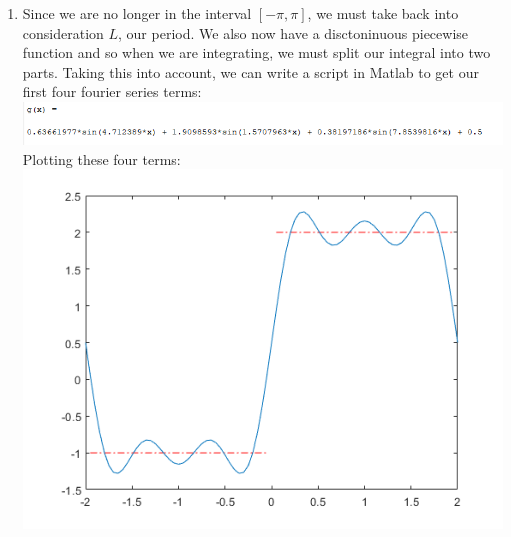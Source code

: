 \documentclass{article}
\begin{document}
\begin{enumerate}
    \item Since we are no longer in the interval $[-\pi, \pi]$, we must take back 
    into consideration $L$, our period. We also now have a disctoninuous piecewise 
    function and so when we are integrating, we must split our integral into two 
    parts. Taking this into account, we can write a script in Matlab to get our first
    four fourier series terms: \\
    \includegraphics[scale = .9]{6.png}\\
    Plotting these four terms: \\
    \includegraphics[scale = .7]{6plot.png}

\end{enumerate}
\end{document}

